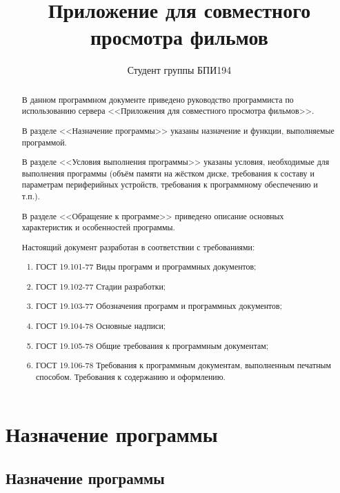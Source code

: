 \documentclass{../includes/TechDoc}
\title{Приложение для совместного просмотра фильмов}
\author{Студент группы БПИ194}{В. А. Анненков}
\begin{document}
    \maketitle

    \begin{abstract}
        В данном программном документе приведено руководство программиста по использованию сервера <<Приложения для совместного просмотра фильмов>>.

        В разделе <<Назначение программы>> указаны назначение и функции, выполняемые программой.

        В разделе <<Условия выполнения программы>> указаны условия, необходимые для выполнения программы (объём памяти на жёстком диске, требования к составу и параметрам периферийных устройств, требования к программному обеспечению и т.п.).

        В разделе <<Обращение к программе>> приведено описание основных характеристик и особенностей программы.

        Настоящий документ разработан в соответствии с требованиями:
        \begin{enumerate}
            \item ГОСТ 19.101-77 Виды программ и программных документов;
            \item ГОСТ 19.102-77 Стадии разработки;
            \item ГОСТ 19.103-77 Обозначения программ и программных документов;
            \item ГОСТ 19.104-78 Основные надписи;
            \item ГОСТ 19.105-78 Общие требования к программным документам;
            \item ГОСТ 19.106-78 Требования к программным документам, выполненным печатным способом.
            Требования к содержанию и оформлению.
        \end{enumerate}
    \end{abstract}

    \newpage

    \tableofcontents

    \section{Назначение программы}

    \subsection{Назначение программы}
\end{document}
